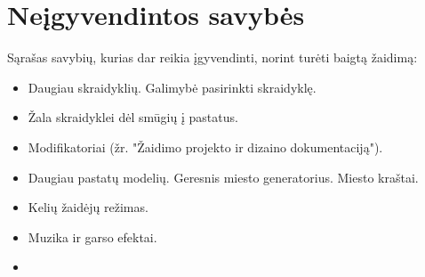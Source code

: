 \section{Neįgyvendintos savybės}


Sąrašas savybių, kurias dar reikia įgyvendinti, norint turėti baigtą žaidimą:
\begin{itemize}
\item Daugiau skraidyklių.
    Galimybė pasirinkti skraidyklę.
\item Žala skraidyklei dėl smūgių į pastatus.
\item Modifikatoriai (žr. "Žaidimo projekto ir dizaino dokumentaciją").
\item Daugiau pastatų modelių.
    Geresnis miesto generatorius.
    Miesto kraštai.
\item Kelių žaidėjų režimas.
\item Muzika ir garso efektai.
\item {}
\end{itemize}

